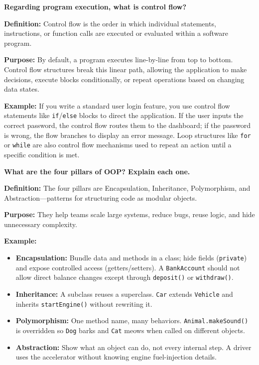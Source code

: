 \newpage


\question[0]
\textbf{Regarding program execution, what is control flow?}

\textbf{Definition:} Control flow is the order in which individual statements, instructions, or function calls are executed or evaluated within a software program.

\textbf{Purpose:} By default, a program executes line-by-line from top to bottom. Control flow structures break this linear path, allowing the application to make decisions, execute blocks conditionally, or repeat operations based on changing data states.

\textbf{Example:} If you write a standard user login feature, you use control flow statements like \texttt{if}/\texttt{else} blocks to direct the application. If the user inputs the correct password, the control flow routes them to the dashboard; if the password is wrong, the flow branches to display an error message. Loop structures like \texttt{for} or \texttt{while} are also control flow mechanisms used to repeat an action until a specific condition is met.

\newpage


\question[0]
\textbf{What are the four pillars of OOP? Explain each one.}

\textbf{Definition:} The four pillars are Encapsulation, Inheritance, Polymorphism, and Abstraction---patterns for structuring code as modular objects.

\textbf{Purpose:} They help teams scale large systems, reduce bugs, reuse logic, and hide unnecessary complexity.

\textbf{Example:}
\begin{itemize}
  \item \textbf{Encapsulation:} Bundle data and methods in a class; hide fields (\texttt{private}) and expose controlled access (getters/setters). A \texttt{BankAccount} should not allow direct balance changes except through \texttt{deposit()} or \texttt{withdraw()}.
  \item \textbf{Inheritance:} A subclass reuses a superclass. \texttt{Car} extends \texttt{Vehicle} and inherits \texttt{startEngine()} without rewriting it.
  \item \textbf{Polymorphism:} One method name, many behaviors. \texttt{Animal.makeSound()} is overridden so \texttt{Dog} barks and \texttt{Cat} meows when called on different objects.
  \item \textbf{Abstraction:} Show what an object can do, not every internal step. A driver uses the accelerator without knowing engine fuel-injection details.
\end{itemize}

